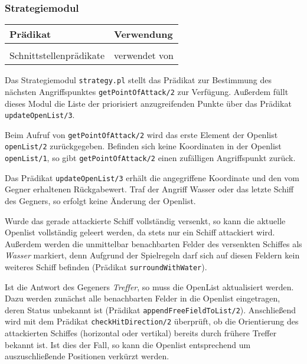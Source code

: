 \subsubsection{Strategiemodul} \label{sec:strategy}

	\begin{table}[H]
	\centering
		\begin{tabular} { | l | l |}
		\hline
		Prädikat & Verwendung \\
		\hline
		 &  \\
		\hline
		Schnittstellenprädikate & verwendet von \\
		\hline
		\end{tabular}
	\end{table}
	
	Das Strategiemodul \texttt{strategy.pl} stellt das Prädikat zur Bestimmung des nächsten Angriffspunktes \texttt{getPointOfAttack/2}
	zur Verfügung. Außerdem füllt dieses Modul die Liste der priorisiert anzugreifenden Punkte über das Prädikat \texttt{updateOpenList/3}. 
	
	Beim Aufruf von \texttt{getPointOfAttack/2} wird das erste Element der Openlist \texttt{openList/2} zurückgegeben.
	Befinden sich keine Koordinaten in der Openlist \texttt{openList/1}, so gibt \texttt{getPointOfAttack/2} einen zufälligen Angriffspunkt zurück.
	
	Das Prädikat \texttt{updateOpenList/3} erhält die angegriffene Koordinate und den vom Gegner erhaltenen Rückgabewert. 
	Traf der Angriff Wasser oder das letzte Schiff des Gegners, so erfolgt keine Änderung der Openlist.
	
	Wurde das gerade attackierte Schiff vollständig versenkt, so kann die aktuelle Openlist vollständig geleert werden, da stets nur ein 
	Schiff attackiert wird. Außerdem werden die unmittelbar benachbarten Felder des versenkten Schiffes als \textit{Wasser} markiert, denn
	Aufgrund der Spielregeln darf sich auf diesen Feldern kein weiteres Schiff befinden (Prädikat \texttt{surroundWithWater}). 
	
	Ist die Antwort des Gegeners \textit{Treffer}, so muss die OpenList aktualisiert werden. 
	Dazu werden zunächst alle benachbarten Felder in die Openlist eingetragen, deren Status unbekannt ist 
	(Prädikat \texttt{appendFreeFieldToList/2}). 
	Anschließend wird mit dem Prädikat \texttt{checkHitDirection/2} überprüft, ob die Orientierung 
	des attackierten Schiffes (horizontal oder vertikal) bereits durch frühere Treffer bekannt ist. 
	Ist dies der Fall, so kann die Openlist entsprechend um auszuschließende Positionen verkürzt werden.

